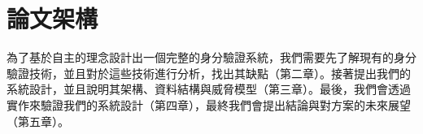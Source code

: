 \section{論文架構}
為了基於自主的理念設計出一個完整的身分驗證系統，我們需要先了解現有的身分驗證技術，並且對於這些技術進行分析，找出其缺點（第二章）。接著提出我們的系統設計，並且說明其架構、資料結構與威脅模型（第三章）。最後，我們會透過實作來驗證我們的系統設計（第四章），最終我們會提出結論與對方案的未來展望（第五章）。